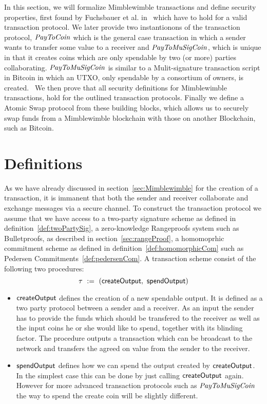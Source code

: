 In this section, we will formalize Mimblewimble transactions and define security properties, first found by Fuchsbauer et al. in~\cite{fuchsbauer2019aggregate} which have to hold for a valid transaction protocol.
We later provide two instantionons of the transaction protocol, $\mathit{PayToCoin}$ which is the general case transaction in which a sender wants to transfer some value to a receiver
and $\mathit{PayToMuSigCoin}$, which is unique in that it creates coins which are only spendable by two (or more) parties collaborating. $\mathit{PayToMuSigCoin}$ is similar
to a Mulit-signature transaction script in Bitcoin in which an UTXO, only spendable by a consortium of owners, is created.~\cite{bistarelli2018analysis}
We then prove that all security definitions for Mimblewimble transactions, hold for the outlined transaction protocols.
Finally we define a Atomic Swap protocol from these building blocks, which allows us to securely swap funds from a Mimblewimble blockchain with those on another Blockchain, such as Bitcoin.

\section{Definitions}\label{sec:atomic-def}

\begin{definition}
    \label{def:tx}
    As we have already discussed in section~\ref{sec:Mimblewimble} for the creation of a transaction, it is immanent that both the sender and receiver collaborate and exchange messages via a secure channel.
    To construct the transaction protocol we assume that we have access to a two-party signature scheme as defined in definition~\ref{def:twoPartySig}, a zero-knowledge Rangeproofs system such as Bulletproofs, as
    described in section~\ref{sec:rangeProof}, a homomoprhic commitment scheme as defined in definition~\ref{def:homomorphicCom} such as Pedersen Commitments~\ref{def:pedersenCom}.
    A transaction scheme consist of the following two procedures:
    \[ \tau ~:=~ ( \mathsf{createOutput} ,~ \mathsf{spendOutput} ) \]
    \begin{itemize}
        \item $\mathsf{createOutput}$ defines the creation of a new spendable output. It is defined as a two party protocol between a sender and a receiver. As an input the
        sender has to provide the funds which should be transfered to the receiver as well as the input coins he or she would like to spend, together with its blinding factor. The procedure
        outputs a transaction which can be broadcast to the network and transfers the agreed on value from the sender to the receiver.
        \item $\mathsf{spendOutput}$ defines how we can spend the output created by $\mathsf{createOutput}$. In the simplest case this can be done by just calling $\mathsf{createOutput}$ again.
        However for more advanced transaction protocols such as $\mathit{PayToMuSigCoin}$ the way to spend the create coin will be slightly different.
    \end{itemize}
\end{definition}

